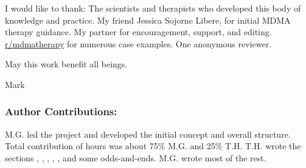 \documentclass[12pt,letterpaper]{book}
\begin{document}
I would like to thank: The scientists and therapists who developed this body of knowledge and practice. My friend Jessica Sojorne Libere, for initial MDMA therapy guidance. My partner for encouragement, support, and editing. \href{https://www.reddit.com/r/mdmatherapy}{r/mdmatherapy} for numerous case examples. One anonymous reviewer.

May this work benefit all beings.

Mark


\subsubsection{Author Contributions:} M.G. led the project and developed the initial concept and overall structure. Total contribution of hours was about 75\% M.G. and 25\% T.H. T.H. wrote the sections , , , , , and some odds-and-ends. M.G. wrote most of the rest.
\end{document}
